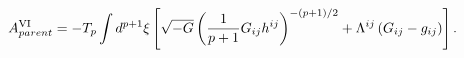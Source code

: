 \begin{equation}
A^{{\rm VI}}_{parent}=-T_{p}\int d^{p+1}{\xi}\left[\sqrt{-G}
\left(\frac{1}{p+1}G_{ij}h^{ij}\right)^{-(p+1)/2}+{\Lambda}^{ij}
\left(G_{ij}-g_{ij}\right)\right].
\end{equation}

